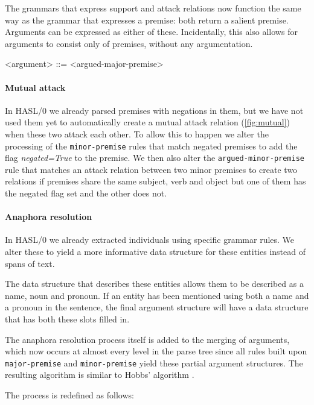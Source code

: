 \noindent The grammars that express support and attack relations now function the same way as the grammar that expresses a premise: both return a salient premise. Arguments can be expressed as either of these. Incidentally, this also allows for arguments to consist only of premises, without any argumentation.

\begin{grammar}
<argument> ::= <argued-major-premise>
\end{grammar}

\paragraph{Mutual attack}
In HASL/0 we already parsed premises with negations in them, but we have not used them yet to automatically create a mutual attack relation (\autoref{fig:mutual}) when these two attack each other. To allow this to happen we alter the processing of the \texttt{minor-premise} rules that match negated premises to add the flag \emph{negated=True} to the premise. We then also alter the \texttt{argued-minor-premise} rule that matches an attack relation between two minor premises to create two relations if premises share the same subject, verb and object but one of them has the negated flag set and the other does not.

\paragraph{Anaphora resolution}
In HASL/0 we already extracted individuals using specific grammar rules. We alter these to yield a more informative data structure for these entities instead of spans of text.

The data structure that describes these entities allows them to be described as a name, noun and pronoun. If an entity has been mentioned using both a name and a pronoun in the sentence, the final argument structure will have a data structure that has both these slots filled in.

The anaphora resolution process itself is added to the merging of arguments, which now occurs at almost every level in the parse tree since all rules built upon \texttt{major-premise} and \texttt{minor-premise} yield these partial argument structures. The resulting algorithm is similar to Hobbs' algorithm \cite{hobbs1978}.

The process is redefined as follows:

